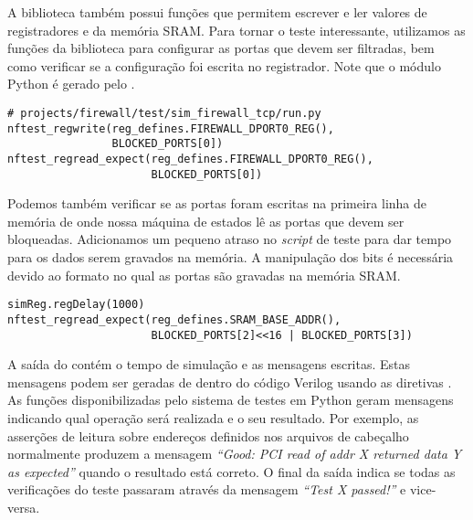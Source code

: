 A biblioteca também possui funções que permitem escrever e ler
valores de registradores e da memória SRAM.  Para tornar o teste
 interessante, utilizamos as funções da
biblioteca para configurar as portas que devem ser filtradas, bem
como verificar se a configuração foi escrita no registrador.  Note
que o módulo Python  é gerado pelo
.

\begin{verbatim}
# projects/firewall/test/sim_firewall_tcp/run.py
nftest_regwrite(reg_defines.FIREWALL_DPORT0_REG(),
                BLOCKED_PORTS[0])
nftest_regread_expect(reg_defines.FIREWALL_DPORT0_REG(),
                      BLOCKED_PORTS[0])
\end{verbatim}

Podemos também verificar se as portas foram escritas na primeira
linha de memória de onde nossa máquina de estados lê as portas que
devem ser bloqueadas.  Adicionamos um pequeno atraso no
\emph{script} de teste para dar tempo para os dados serem gravados
na memória.  A manipulação dos bits é necessária devido ao formato
no qual as portas são gravadas na memória SRAM.

\begin{verbatim}
simReg.regDelay(1000)
nftest_regread_expect(reg_defines.SRAM_BASE_ADDR(),
                      BLOCKED_PORTS[2]<<16 | BLOCKED_PORTS[3])
\end{verbatim}

A saída do  contém o tempo de simulação e as
mensagens escritas.  Estas mensagens podem ser geradas de dentro do
código Verilog usando as diretivas .  As funções
disponibilizadas pelo sistema de testes em Python geram mensagens
indicando qual operação será realizada e o seu resultado. Por
exemplo, as asserções de leitura sobre endereços definidos nos
arquivos de cabeçalho normalmente produzem a mensagem \emph{``Good:
PCI read of addr X returned data Y as expected''} quando o resultado
está correto. O final da saída indica se todas as verificações do
teste passaram através da mensagem \emph{``Test X passed!''} e
vice-versa.



